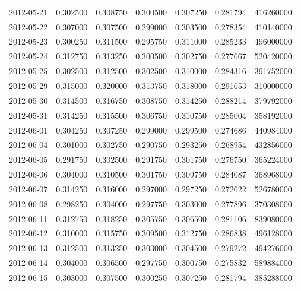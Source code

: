 \begin{tabular}{lrrrrrr}
2012-05-21 &    0.302500 &    0.308750 &    0.300500 &    0.307250 &    0.281794 &   416260000 \\
2012-05-22 &    0.307000 &    0.307500 &    0.299000 &    0.303500 &    0.278354 &   410140000 \\
2012-05-23 &    0.300250 &    0.311500 &    0.295750 &    0.311000 &    0.285233 &   496000000 \\
2012-05-24 &    0.312750 &    0.313250 &    0.300500 &    0.302750 &    0.277667 &   520420000 \\
2012-05-25 &    0.302500 &    0.312500 &    0.302500 &    0.310000 &    0.284316 &   391752000 \\
2012-05-29 &    0.315000 &    0.320000 &    0.313750 &    0.318000 &    0.291653 &   310000000 \\
2012-05-30 &    0.314500 &    0.316750 &    0.308750 &    0.314250 &    0.288214 &   379792000 \\
2012-05-31 &    0.314250 &    0.315500 &    0.306750 &    0.310750 &    0.285004 &   358192000 \\
2012-06-01 &    0.304250 &    0.307250 &    0.299000 &    0.299500 &    0.274686 &   440984000 \\
2012-06-04 &    0.301000 &    0.302750 &    0.290750 &    0.293250 &    0.268954 &   432856000 \\
2012-06-05 &    0.291750 &    0.302500 &    0.291750 &    0.301750 &    0.276750 &   365224000 \\
2012-06-06 &    0.304000 &    0.310500 &    0.301750 &    0.309750 &    0.284087 &   368968000 \\
2012-06-07 &    0.314250 &    0.316000 &    0.297000 &    0.297250 &    0.272622 &   526780000 \\
2012-06-08 &    0.298250 &    0.304000 &    0.297750 &    0.303000 &    0.277896 &   370308000 \\
2012-06-11 &    0.312750 &    0.318250 &    0.305750 &    0.306500 &    0.281106 &   839080000 \\
2012-06-12 &    0.310000 &    0.315750 &    0.309500 &    0.312750 &    0.286838 &   496128000 \\
2012-06-13 &    0.312500 &    0.313250 &    0.303000 &    0.304500 &    0.279272 &   494276000 \\
2012-06-14 &    0.304000 &    0.306500 &    0.297750 &    0.300750 &    0.275832 &   589884000 \\
2012-06-15 &    0.303000 &    0.307500 &    0.300250 &    0.307250 &    0.281794 &   385288000 \\

\end{tabular}
